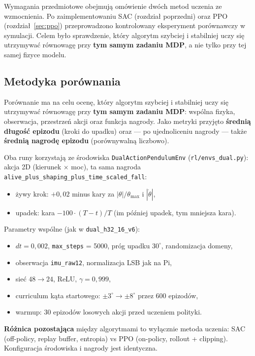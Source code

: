 \documentclass[12pt,twoside]{article}
\begin{document}
Wymagania przedmiotowe obejmują omówienie dwóch metod uczenia ze wzmocnienia. Po zaimplementowaniu SAC (rozdział poprzedni) oraz PPO (rozdział~\ref{sec:ppo}) przeprowadzono kontrolowany eksperyment porównawczy w symulacji. Celem było sprawdzenie, który algorytm szybciej i stabilniej uczy się utrzymywać równowagę przy \textbf{tym samym zadaniu MDP}, a nie tylko przy tej samej fizyce modelu.

\subsection{Metodyka porównania}

Porównanie ma na celu ocenę, który algorytm szybciej i stabilniej uczy się utrzymywać równowagę przy \textbf{tym samym zadaniu MDP}: wspólna fizyka, obserwacja, przestrzeń akcji oraz funkcja nagrody. Jako metryki przyjęto \textbf{średnią długość epizodu} (kroki do upadku) oraz --- po ujednoliceniu nagrody --- także \textbf{średnią nagrodę epizodu} (porównywalną liczbowo).

Oba runy korzystają ze środowiska \texttt{DualActionPendulumEnv} (\texttt{rl/envs\_dual.py}): akcja 2D (kierunek $\times$ moc), ta sama nagroda \texttt{alive\_plus\_shaping\_plus\_time\_scaled\_fall}:
\begin{itemize}
    \item żywy krok: $+0{,}02$ minus kary za $|\theta|/\theta_{\max}$ i $|\dot\theta|$,
    \item upadek: kara $-100 \cdot (T - t) / T$ (im później upadek, tym mniejsza kara).
\end{itemize}

Parametry wspólne (jak w \texttt{dual\_h32\_16\_v6}):
\begin{itemize}
    \item $dt = 0{,}002$, \texttt{max\_steps} = 5000, próg upadku $30^\circ$, randomizacja domeny,
    \item obserwacja \texttt{imu\_raw12}, normalizacja LSB jak na Pi,
    \item sieć $48 \rightarrow 24$, ReLU, $\gamma = 0{,}999$,
    \item curriculum kąta startowego: $\pm 3^\circ \rightarrow \pm 8^\circ$ przez 600 epizodów,
    \item warmup: 30 epizodów losowych akcji przed uczeniem polityki.
\end{itemize}

\textbf{Różnica pozostająca} między algorytmami to wyłącznie metoda uczenia: SAC (off-policy, replay buffer, entropia) vs PPO (on-policy, rollout + clipping). Konfiguracja środowiska i nagrody jest identyczna.
\end{document}
